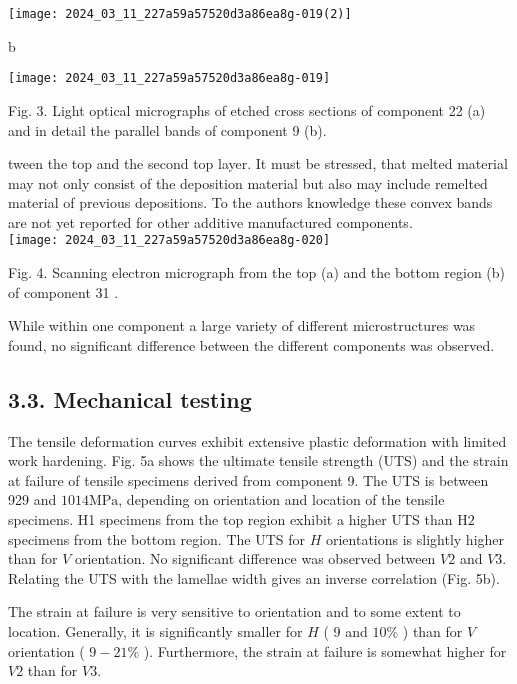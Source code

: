 \documentclass[10pt]{article}
\begin{document}
\begin{center}
\texttt{[image: 2024\_03\_11\_227a59a57520d3a86ea8g-019(2)]}
\end{center}

b

\begin{center}
\texttt{[image: 2024\_03\_11\_227a59a57520d3a86ea8g-019]}
\end{center}

Fig. 3. Light optical micrographs of etched cross sections of component 22 (a) and in detail the parallel bands of component 9 (b).

tween the top and the second top layer. It must be stressed, that melted material may not only consist of the deposition material but also may include remelted material of previous depositions. To the authors knowledge these convex bands are not yet reported for other additive manufactured components.\\
\texttt{[image: 2024\_03\_11\_227a59a57520d3a86ea8g-020]}

Fig. 4. Scanning electron micrograph from the top (a) and the bottom region (b) of component 31 .

While within one component a large variety of different microstructures was found, no significant difference between the different components was observed.

\subsection*{3.3. Mechanical testing}
The tensile deformation curves exhibit extensive plastic deformation with limited work hardening. Fig. 5a shows the ultimate tensile strength (UTS) and the strain at failure of tensile specimens derived from component 9. The UTS is between 929 and $1014 \mathrm{MPa}$, depending on orientation and location of the tensile specimens. H1 specimens from the top region exhibit a higher UTS than $\mathrm{H} 2$ specimens from the bottom region. The UTS for $H$ orientations is slightly higher than for $V$ orientation. No significant difference was observed between $V 2$ and $V 3$. Relating the UTS with the lamellae width gives an inverse correlation (Fig. 5b).

The strain at failure is very sensitive to orientation and to some extent to location. Generally, it is significantly smaller for $H$ ( 9 and $10 \%$ ) than for $V$ orientation ( $9-21 \%$ ). Furthermore, the strain at failure is somewhat higher for $V 2$ than for $V 3$.
\end{document}
